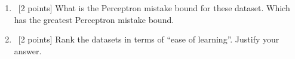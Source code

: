\begin{enumerate}
\begin{enumerate}
   \begin{figure}[H]
    \centering
    \caption{Points in set $D_3$.} \label{SetD3}
  \end{figure}   

As can be seen in figure \ref{SetD3}, the points are not linearly separable. So there os no separating margin.

  \item ~[2 points] What is the Perceptron mistake bound for these
    dataset. Which has the greatest Perceptron mistake bound.
  \item ~[2 points] Rank the datasets in terms of ``ease of
    learning''. Justify your answer.
  \end{enumerate}

\end{enumerate}


